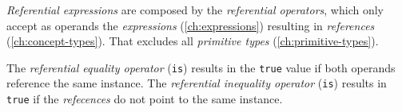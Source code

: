 \emph{Referential expressions} are composed by the \emph{referential operators},
which only accept as operands the \emph{expressions} (\ref{ch:expressions})
resulting in \emph{references} (\ref{ch:concept-types}).
That excludes all \emph{primitive types} (\ref{ch:primitive-types}).

The \emph{referential equality operator} (\verb|is|)
results in the \verb|true| value
if both operands reference the same instance.
The \emph{referential inequality operator} (\verb|is|)
results in \verb|true| if the \emph{refecences} do not point to the same instance.
